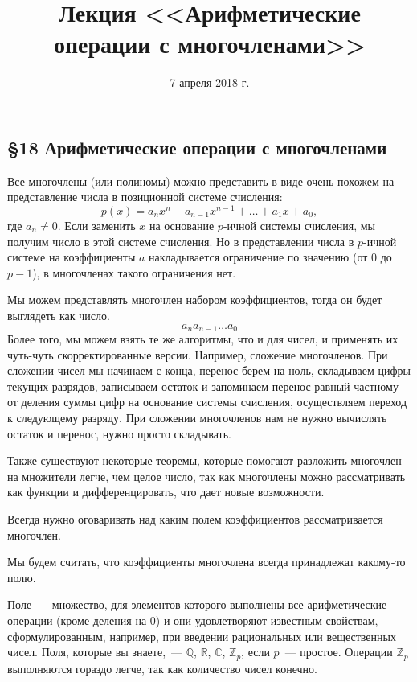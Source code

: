 \documentclass[russian]{lecture-notes}
\title{Лекция <<Арифметические операции с многочленами>>}
\date{7 апреля 2018 г.}
\theoremstyle{definition}
\begin{document}
	\maketitle
	
	\begin{center}
		\section*{\LARGE\S 18 Арифметические операции с многочленами}
		\label{par:mnogoch}
	\end{center}

	\noindent Все многочлены (или полиномы) можно представить в виде очень похожем на представление числа в позиционной системе счисления:
	\[ p(x) = a_nx^n + a_{n-1}x^{n-1} + \ldots + a_1x + a_0, \]
	где $a_n \ne 0$. Если заменить $x$ на основание $p$-ичной системы счисления, мы получим число в этой системе счисления. Но в представлении числа в $p$-ичной системе на коэффициенты $a$ накладывается ограничение по значению (от $0$ до $p-1$), в многочленах такого ограничения нет. 
	
	Мы можем представлять многочлен набором коэффициентов, тогда он будет выглядеть как число.
	\[
		a_na_{n-1} \ldots a_0
	\]
	Более того, мы можем взять те же алгоритмы, что и для чисел, и применять их чуть-чуть скорректированные версии. Например, сложение многочленов. При сложении чисел мы начинаем с конца, перенос берем на ноль, складываем цифры текущих разрядов, записываем остаток и запоминаем перенос равный частному от деления суммы цифр на основание системы счисления, осуществляем переход к следующему разряду. При сложении многочленов нам не нужно вычислять остаток и перенос, нужно просто складывать.
	
	Также существуют некоторые теоремы, которые помогают разложить многочлен на множители легче, чем целое число, так как многочлены можно рассматривать как функции и дифференцировать, что дает новые возможности.
	
	\begin{remark}
		Всегда нужно оговаривать над каким полем коэффициентов рассматривается многочлен.
		
		Мы будем считать, что коэффициенты многочлена всегда принадлежат какому-то полю.
	\end{remark}

	\begin{note}
		Поле~--- множество, для элементов которого выполнены все арифметические операции (кроме деления на $0$) и они удовлетворяют известным свойствам, сформулированным, например, при введении рациональных или вещественных чисел. Поля, которые вы знаете,~--- $\mathbb{Q}$, $\mathbb{R}$, $\mathbb{C}$, $\mathbb{Z}_p$, если $p$~--- простое. Операции $\mathbb{Z}_p$ выполняются гораздо легче, так как количество чисел конечно.
	\end{note}
	
\end{document}
